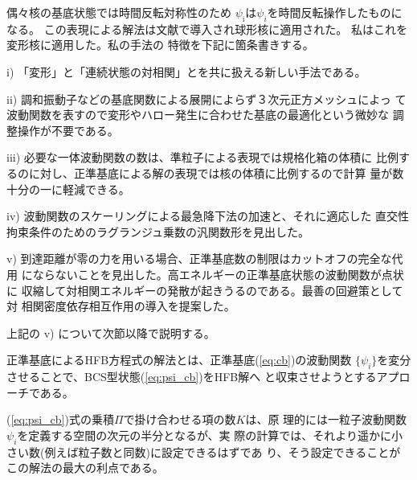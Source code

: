 \vspace*{-1mm}

\noindent
偶々核の基底状態では時間反転対称性のため
$\psi_{\bar{\imath}}$は$\psi_{i}$を時間反転操作したものになる。
この表現による解法は文献\cite{RBR97}で導入され球形核に適用された。
私はこれを変形核に適用した\cite{Taj98a,Taj98ws1,Taj00a}。私の手法の
特徴を下記に箇条書きする。

\vspace*{2mm}

\noindent
i) 「変形」と「連続状態の対相関」とを共に扱える新しい手法である。

\vspace*{2mm} 

\noindent
ii) 調和振動子などの基底関数による展開によらず３次元正方メッシュによっ
て波動関数を表すので変形やハロー発生に合わせた基底の最適化という微妙な
調整操作が不要である。

\vspace*{2mm} 

\noindent
iii) 必要な一体波動関数の数は、準粒子による表現では規格化箱の体積に
比例するのに対し、正準基底による解の表現では核の体積に比例するので計算
量が数十分の一に軽減できる。

\vspace*{2mm} 

\noindent
iv) 波動関数のスケーリングによる最急降下法の加速と、それに適応した
直交性拘束条件のためのラグランジュ乗数の汎関数形を見出した。

\vspace*{2mm} 

\noindent
v) 到達距離が零の力を用いる場合、正準基底数の制限はカットオフの完全な代用
にならないことを見出した。高エネルギーの正準基底状態の波動関数が点状に
収縮して対相関エネルギーの発散が起きうるのである。最善の回避策として対
相関密度依存相互作用の導入を提案した。

\vspace*{2mm} 

上記の v) について次節以降で説明する。


正準基底によるHFB方程式の解法とは、正準基底(\ref{eq:cb})の波動関数
$\{ \psi_i \}$を変分させることで、BCS型状態(\ref{eq:psi_cb})をHFB解へ
と収束させようとするアプローチである。

(\ref{eq:psi_cb})式の乗積$\Pi$で掛け合わせる項の数$K$は、原
理的には一粒子波動関数 $\psi_i$を定義する空間の次元の半分となるが、実
際の計算では、それより遥かに小さい数(例えば粒子数と同数)に設定できるはずであ
り、そう設定できることがこの解法の最大の利点である\cite{Taj98a}。

